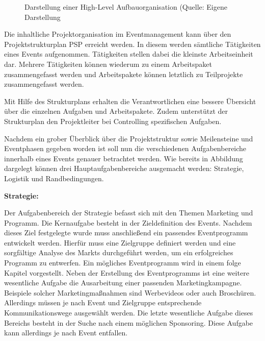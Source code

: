 \begin{figure}[H]
    \centering
    \setlength{\fboxsep}{10pt}
    \setlength{\fboxrule}{0.5pt}
    \caption[Eventmanagement: Aufbauorganisation]{Darstellung einer High-Level Aufbauorganisation (Quelle: Eigene Darstellung} \label{fig:EM_Aufbauorganisation}
\end{figure}

Die inhaltliche Projektorganisation im Eventmanagement kann über den Projektstrukturplan PSP\autocite[]{projektmanagementdefinitionen.de.o.J.} erreicht werden. In diesem werden sämtliche Tätigkeiten eines Events aufgenommen. Tätigkeiten stellen dabei die kleinste Arbeitseinheit dar. Mehrere Tätigkeiten können wiederum zu einem Arbeitspaket zusammengefasst werden und Arbeitspakete können letztlich zu Teilprojekte zusammengefasst werden.\autocite[Vgl.][S. 144 f.]{Holzbaur.2002}

Mit Hilfe des Strukturplans erhalten die Verantwortlichen eine bessere Übersicht über die einzelnen Aufgaben und Arbeitspakete. Zudem unterstützt der Strukturplan den Projektleiter bei Controlling spezifischen Aufgaben.

Nachdem ein grober Überblick über die Projektstruktur sowie Meilensteine und Eventphasen gegeben worden ist soll nun die verschiedenen Aufgabenbereiche innerhalb eines Events genauer betrachtet werden. Wie bereits in Abbildung dargelegt können drei Hauptaufgabenbereiche ausgemacht werden: Strategie, Logistik und Randbedingungen. 

\textbf{Strategie:}

Der Aufgabenbereich der Strategie befasst sich mit den Themen Marketing und Programm. Die Kernaufgabe besteht in der Zieldefinition des Events. Nachdem dieses Ziel festgelegte wurde muss anschließend ein passendes Eventprogramm entwickelt werden. Hierfür muss eine Zielgruppe definiert werden und eine sorgfältige Analyse des Markts durchgeführt werden, um ein erfolgreiches Programm zu entwerfen. Ein mögliches Eventprogramm wird in einem folge Kapitel vorgestellt. Neben der Erstellung des Eventprogramms ist eine weitere wesentliche Aufgabe die Ausarbeitung einer passenden Marketingkampagne. Beispiele solcher Marketingmaßnahmen sind Werbevideos oder auch Broschüren. Allerdings müssen je nach Event und Zielgruppe entsprechende Kommunikationswege ausgewählt werden. Die letzte wesentliche Aufgabe dieses Bereichs besteht in der Suche nach einem möglichen Sponsoring. Diese Aufgabe kann allerdings je nach Event entfallen.

